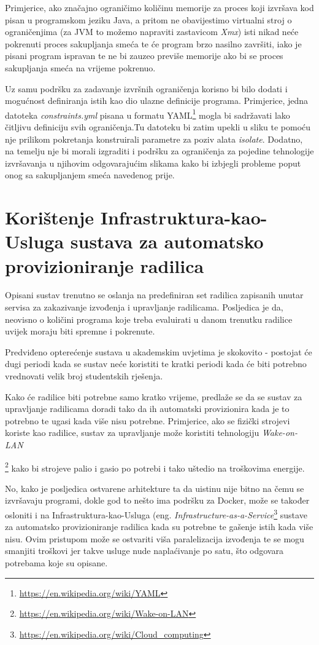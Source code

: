 \documentclass[times, utf8, zavrsni]{fer}
\begin{document}
{{Primjerice, ako značajno ograničimo količinu memorije za proces koji izvršava kod pisan u programskom jeziku Java, a pritom ne obavijestimo virtualni stroj o ograničenjima (za JVM to možemo napraviti zastavicom {\textit{Xmx}}) isti nikad neće pokrenuti proces sakupljanja smeća te će program brzo nasilno završiti, iako je pisani program ispravan te ne bi zauzeo previše memorije ako bi se proces sakupljanja smeća na vrijeme pokrenuo.

Uz samu podršku za zadavanje izvršnih ograničenja korisno bi bilo dodati i mogućnost definiranja istih kao dio ulazne definicije programa. Primjerice, jedna datoteka {\textit{constraints.yml}} pisana u formatu YAML\footnote{\url{https://en.wikipedia.org/wiki/YAML}} mogla bi sadržavati lako čitljivu definiciju svih ograničenja.Tu datoteku bi zatim upekli u sliku te pomoću nje prilikom pokretanja konstruirali parametre za poziv alata {\textit{isolate}}. Dodatno, na temelju nje bi morali izgraditi i podršku za ograničenja za pojedine tehnologije izvršavanja u njihovim odgovarajućim slikama kako bi izbjegli probleme poput onog sa sakupljanjem smeća navedenog prije.


\section{Korištenje Infrastruktura-kao-Usluga sustava za automatsko provizioniranje radilica}

Opisani sustav trenutno se oslanja na predefiniran set radilica zapisanih unutar servisa za zakazivanje izvođenja i upravljanje radilicama. Posljedica je da, neovisno o količini programa koje treba evaluirati u danom trenutku radilice uvijek moraju biti spremne i pokrenute.

Predviđeno opterećenje sustava u akademskim uvjetima je skokovito - postojat će dugi periodi kada se sustav neće koristiti te kratki periodi kada će biti potrebno vrednovati velik broj studentskih rješenja.

Kako će radilice biti potrebne samo kratko vrijeme, predlaže se da se sustav za upravljanje radilicama doradi tako da ih automatski provizionira kada je to potrebno te ugasi kada više nisu potrebne. Primjerice, ako se fizički strojevi koriste kao radilice, sustav za upravljanje može koristiti tehnologiju {\textit{Wake-on-LAN}}{\footnote{\url{https://en.wikipedia.org/wiki/Wake-on-LAN}} kako bi strojeve palio i gasio po potrebi i tako uštedio na troškovima energije.

No, kako je posljedica ostvarene arhitekture ta da uistinu nije bitno na čemu se izvršavaju programi, dokle god to nešto ima podršku za Docker, može se također osloniti i na Infrastruktura-kao-Usluga (eng. {\textit{Infrastructure-as-a-Service}}{\footnote{{\url{https://en.wikipedia.org/wiki/Cloud_computing}}}} sustave za automatsko provizioniranje radilica kada su potrebne te gašenje istih kada više nisu. Ovim pristupom može se ostvariti viša paralelizacija izvođenja te se mogu smanjiti troškovi jer takve usluge nude naplaćivanje po satu, što odgovara potrebama koje su opisane.

}}}
\end{document}
